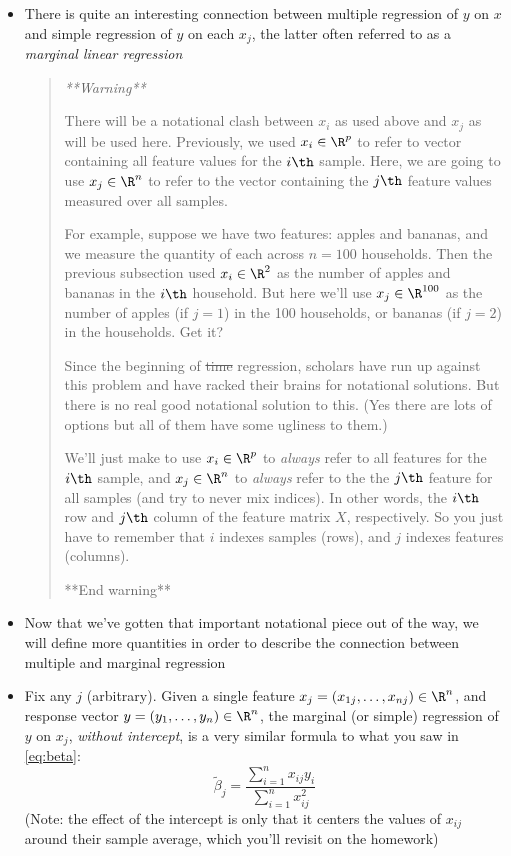 \documentclass{article}
\begin{document}
\begin{itemize}
\item There is quite an interesting connection between multiple regression of
  $y$ on $x$ and simple regression of $y$ on each $x_j$, the latter often
  referred to as a \emph{marginal linear regression}

\begin{quote}\it
**Warning** 

There will be a notational clash between $x_i$ as used above and $x_j$ as will
be used here. Previously, we used $x_i \in \R^p$ to refer to vector containing
all feature values for the $i\th$ sample. Here, we are going to use $x_j \in
\R^n$ to refer to the vector containing the $j\th$ feature values measured over
all samples.       

For example, suppose we have two features: apples and bananas, and we measure
the quantity of each across $n = 100$ households. Then the previous subsection
used $x_i \in \R^2$ as the number of apples and bananas in the $i\th$
household. But here we'll use $x_j \in \R^{100}$ as the number of apples (if
$j=1$) in the 100 households, or bananas (if $j=2$) in the households. Get it? 

Since the beginning of \sout{time} regression, scholars have run up against this
problem and have racked their brains for notational solutions. But there is no
real good notational solution to this. (Yes there are lots of options but all of
them have some ugliness to them.)

We'll just make to use $x_i \in \R^p$ to \emph{always} refer to all features for
the $i\th$ sample, and $x_j \in \R^n$ to \emph{always} refer to the the $j\th$
feature for all samples (and try to never mix indices). In other words, the
$i\th$ row and $j\th$ column of the feature matrix $X$, respectively. So you
just have to remember that $i$ indexes samples (rows), and $j$ indexes features
(columns). 

**End warning** 
\end{quote}

\item Now that we've gotten that important notational piece out of the way, we
  will define more quantities in order to describe the connection between
  multiple and marginal regression

\item Fix any $j$ (arbitrary). Given a single feature $x_j = (x_{1j}, \dots,
  x_{nj}) \in \R^n$, and response vector $y = (y_1, \dots, y_n) \in \R^n$, the 
  marginal (or simple) regression of $y$ on $x_j$, \emph{without intercept}, is
  a very similar formula to what you saw in \eqref{eq:beta}:
  \[
  \tilde\beta_j = \frac{\sum_{i=1}^n x_{ij} y_i}{\sum_{i=1}^n x_{ij}^2} 
  \]
  (Note: the effect of the intercept is only that it centers the values of
  $x_{ij}$ around their sample average, which you'll revisit on the homework)    


\end{itemize}
\end{document}
